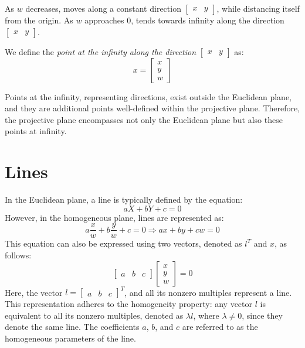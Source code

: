 \documentclass[12pt, a4paper]{report}
\begin{document}
    As $w$ decreases, moves along a constant direction $\begin{bmatrix} x & y \end{bmatrix}$, while distancing itself from the origin. 
    As $w$ approaches $0$, tends towards infinity along the direction $\begin{bmatrix} x & y \end{bmatrix}$. 
    \begin{definition}
        We define the \emph{point at the infinity along the direction} $\begin{bmatrix} x & y \end{bmatrix}$ as: 
        \[x=\begin{bmatrix} x \\ y \\ w \end{bmatrix}\]
    \end{definition}
    Points at the infinity, representing directions, exist outside the Euclidean plane, and they are additional points well-defined within the projective plane. 
    Therefore, the projective plane encompasses not only the Euclidean plane but also these points at infinity.

    \section{Lines}
    In the Euclidean plane, a line is typically defined by the equation:
    \[aX+bY+c=0\]
    However, in the homogeneous plane, lines are represented as:
    \[a\dfrac{x}{w}+b \dfrac{y}{w}+c=0 \Longrightarrow ax+by+cw=0\]
    This equation can also be expressed using two vectors, denoted as $l^T$ and $x$, as follows:
    \[\begin{bmatrix} a & b & c \end{bmatrix} \begin{bmatrix} x \\ y \\ w \end{bmatrix}=0\]
    Here, the vector $l={\begin{bmatrix} a & b & c \end{bmatrix}}^T$, and all its nonzero multiples represent a line.  
    This representation adheres to the homogeneity property: any vector $l$ is equivalent to all its nonzero multiples, denoted as $\lambda l$, where $\lambda\neq 0$, since they denote the same line. 
    The coefficients $a$, $b$, and $c$ are referred to as the homogeneous parameters of the line.
    
\end{document}
